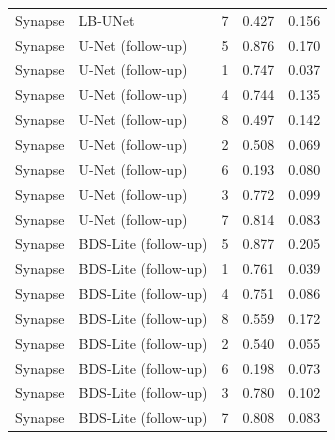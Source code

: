\begin{longtable}{lllll}
Synapse & LB-UNet & 7 & 0.427 & 0.156 \\
Synapse & U-Net (follow-up) & 5 & 0.876 & 0.170 \\
Synapse & U-Net (follow-up) & 1 & 0.747 & 0.037 \\
Synapse & U-Net (follow-up) & 4 & 0.744 & 0.135 \\
Synapse & U-Net (follow-up) & 8 & 0.497 & 0.142 \\
Synapse & U-Net (follow-up) & 2 & 0.508 & 0.069 \\
Synapse & U-Net (follow-up) & 6 & 0.193 & 0.080 \\
Synapse & U-Net (follow-up) & 3 & 0.772 & 0.099 \\
Synapse & U-Net (follow-up) & 7 & 0.814 & 0.083 \\
Synapse & BDS-Lite (follow-up) & 5 & 0.877 & 0.205 \\
Synapse & BDS-Lite (follow-up) & 1 & 0.761 & 0.039 \\
Synapse & BDS-Lite (follow-up) & 4 & 0.751 & 0.086 \\
Synapse & BDS-Lite (follow-up) & 8 & 0.559 & 0.172 \\
Synapse & BDS-Lite (follow-up) & 2 & 0.540 & 0.055 \\
Synapse & BDS-Lite (follow-up) & 6 & 0.198 & 0.073 \\
Synapse & BDS-Lite (follow-up) & 3 & 0.780 & 0.102 \\
Synapse & BDS-Lite (follow-up) & 7 & 0.808 & 0.083 \\
\bottomrule
\end{longtable}

